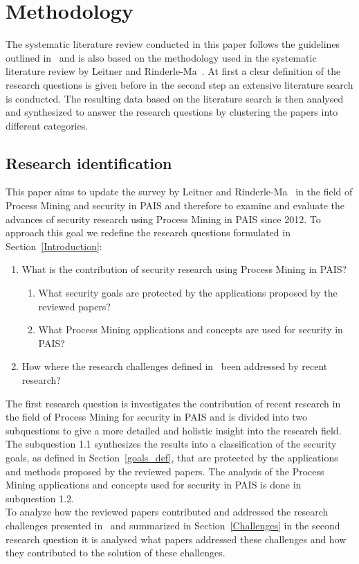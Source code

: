 \documentclass[runningheads]{llncs}
\begin{document}
\section{Methodology}\label{Methodology}
The systematic literature review conducted in this paper follows the guidelines outlined in~\cite{BRERETON2007571} and is also based on the methodology used in the systematic literature review by Leitner and Rinderle-Ma~\cite{Leitner2014273}.
At first a clear definition of the research questions is given before in the second step an extensive literature search is conducted. The resulting data based on the literature search is then analysed and synthesized to answer the research questions by clustering
the papers into different categories.\\
\subsection{Research identification}\label{Identification}
This paper aims to update the survey by Leitner and Rinderle-Ma~\cite{Leitner2014273} in the field of Process Mining and security in PAIS  and therefore to examine and evaluate the advances of security research using Process Mining in PAIS since 2012.
To approach this goal we redefine the research questions formulated in Section~\ref{Introduction}:
\begin{enumerate}
    \item What is the contribution of security research using Process Mining in PAIS\@?
          \begin{enumerate}
              \item What security goals are protected by the applications proposed by the reviewed papers?
              \item What Process Mining applications and concepts are used for security in PAIS\@?
          \end{enumerate}
    \item How where the research challenges defined in~\cite{Leitner2014273} been addressed by recent research?
\end{enumerate}
The first research question is investigates the contribution of recent research in the field of Process Mining for security in PAIS and is divided into two subquestions to give a more detailed and holistic insight into the research field.
The subquestion 1.1 synthesizes the results into a classification of the security goals, as defined in Section~\ref{goals_def}, that are protected by the applications and methods proposed by the reviewed papers.
The analysis of the Process Mining applications and concepts used for security in PAIS is done in subquestion 1.2.\\
To analyze how the reviewed papers contributed and addressed the research challenges presented in~\cite{Leitner2014273} and summarized in Section~\ref{Challenges} in the second research question it is analysed what papers addressed these challenges
and how they contributed to the solution of these challenges.
\end{document}
